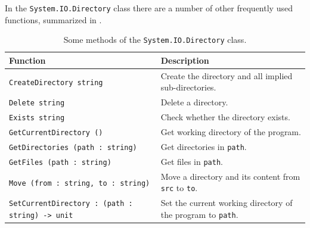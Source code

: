 \documentclass[fsharpNotes.tex]{subfiles}
\begin{document}
In the \lstinline!System.IO.Directory! class there are a number of other frequently used functions, summarized in .%
%
%
%
%
%
%
%
%
\begin{table}
  \begin{center}
    \begin{tabularx}{\linewidth}{|l|X|}
      \hline
      \rowcolor{headerRowColor}  Function & Description\\
      \hline
      \lstinline{CreateDirectory string} & Create the directory and all implied sub-directories.\\
      \hline
      \lstinline{Delete string} & Delete a directory.\\
      \hline
      \lstinline{Exists string} & Check whether the directory exists.\\
      \hline
      \lstinline{GetCurrentDirectory ()} & Get working directory of the program.\\
      \hline
      \lstinline{GetDirectories (path : string)} & Get directories in \lstinline{path}.\\
      \hline
      \lstinline{GetFiles (path : string)} & Get files in \lstinline{path}.\\
      \hline
      \lstinline{Move (from : string, to : string)} & Move a directory and its content from \lstinline{src} to \lstinline{to}.\\
      \hline
      \lstinline{SetCurrentDirectory : (path : string) -> unit} & Set the current working directory of the program to \lstinline{path}.\\
      \hline
    \end{tabularx}
  \end{center}
  \caption{Some methods of the \lstinline!System.IO.Directory! class.}
  \label{tab:directory}
\end{table}
\clearpage
\end{document}
